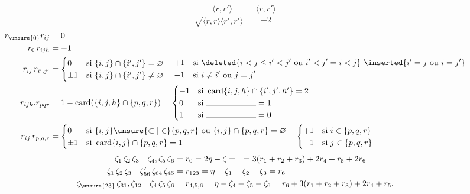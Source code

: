 \[
\frac{-\langle r,r'\rangle}{\sqrt{\langle r,r\rangle\langle r',r'\rangle}}=\frac{\langle r,r'\rangle}{-2}
\]
\[
\begin{aligned}
r_{\unsure{0}}r_{ij}&=0\\
r_0\,r_{ijh}&=-1\\
r_{ij}\,r_{i',j'}&=\begin{cases}
0&\text{si }\{i,j\}\cap\{i',j'\}=\varnothing\\
\pm1&\text{si }\{i,j\}\cap\{i',j'\}\ne\varnothing
\end{cases}
\quad\begin{aligned}
+1&\quad\text{si }\deleted{i<j\le i'<j'\ \text{ou}\ i'<j'=i<j}\ \inserted{i'=j\ \text{ou}\ i=j'}\\
-1&\quad\text{si }i\ne i'\ \text{ou}\ j=j'
\end{aligned}\\
r_{ijh}.r_{pqr}&=1-\operatorname{card}(\{i,j,h\}\cap\{p,q,r\})=
\begin{cases}-1&\text{si }\operatorname{card}\{i,j,h\}\cap\{i',j',h'\}=2\\
0&\text{si }\rule{6em}{.3pt}=1\\1&\text{si }\rule{6em}{.3pt}=0\end{cases}\\
r_{ij}\,r_{p,q,r}&=\begin{cases}
0&\text{si }\{i,j\}\unsure{\subset|\in}\{p,q,r\}\text{ ou }\{i,j\}\cap\{p,q,r\}=\varnothing\\
\pm1&\text{si }\operatorname{card}\{i,j\}\cap\{p,q,r\}=1
\end{cases}\quad
\begin{cases}+1&\text{si }i\in\{p,q,r\}\\-1&\text{si }j\in\{p,q,r\}\end{cases}
\end{aligned}
\]
\[
\begin{aligned}
\zeta_1\,\zeta_2\,\zeta_3\quad\zeta_4,\zeta_5\,\zeta_6&=r_0=2\eta-\zeta
= \quad=3(r_1+r_2+r_3)+2r_4+r_5+2r_6\\
\zeta_1\,\zeta_2\,\zeta_3\quad\zeta'_{56}\,\zeta_{64}\,\zeta_{45}
&=r_{123}=\eta-\zeta_1-\zeta_2-\zeta_3=r_6\\
\zeta_{\unsure{23}}\,\zeta_{31},\zeta_{12}\quad\zeta_4\,\zeta_5\,\zeta_6
&=r_{4,5,6}=\eta-\zeta_4-\zeta_5-\zeta_6=r_6+3(r_1+r_2+r_3)+2r_4+r_5 .
\end{aligned}
\]
